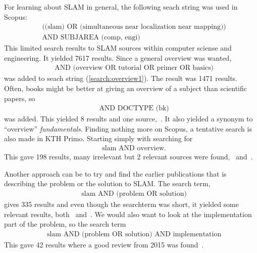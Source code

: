 For learning about SLAM in general, the following seach string was used in Scopus:
\begin{align}
    \label{search:overview1}
    &\text{((slam) OR (simultaneous near localization near mapping))}\nonumber \\
    &\text{AND SUBJAREA (comp, engi)}
\end{align}
This limited search results to SLAM sources within computer sciense and
engineering. It yielded 7617 results. Since a general overview was wanted, 
\begin{align}
    \label{search:overview2}
    &\text{AND (overview OR tutorial OR primer OR basics)}
\end{align}
was added to seach string (\ref{search:overview1}). The result was 1471 results.
Often, books might be better at giving an overview of a subject than scientific
papers, so
\begin{align}
    \label{search:overview3}
    &\text{AND DOCTYPE (bk)}
\end{align}
was added. This yielded 8 results and one source,~\cite{Kernbach20131}. It also
yielded a synonym to ``overview'' \textit{fundamentals}. 
Finding nothing more on Scopus, a tentative search is also made in KTH Primo.
Starting  simply with searching for
\begin{align}
    \label{search:overview4}
    &\text{slam AND overview}.
\end{align}
This gave 198 results, many irrelevant but 2 relevant sources were
found,~\cite{Frese2010} and~\cite{5769022}.

Another approach can be to try and find the earlier publications that is describing the
problem or the solution to SLAM\@. The search term,
\begin{align}
    \label{search:overview5}
    &\text{slam AND (problem OR solution)} 
\end{align}
gives 335 results and even though the searchterm was short, it yielded some
relevant results, both~\cite{938381} and~\cite{844732}. We would also want to look at the implementation part of the problem, so the search term
\begin{align}
    \label{search:overview6}
    &\text{slam AND (problem OR solution) AND implementation} 
\end{align}
This gave 42 results where a good review from 2015 was found~\cite{7482163}.
